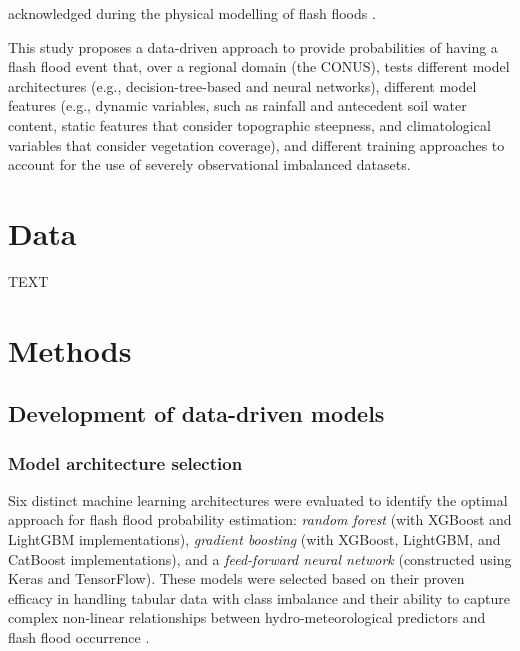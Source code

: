 \documentclass[nhess, manuscript]{copernicus}
\begin{document}
acknowledged during the physical modelling of flash floods \citep{Saharia_2021}.

This study proposes a data-driven approach to provide probabilities of having a flash flood event that, over a regional domain (the CONUS), tests different model architectures (e.g., decision-tree-based and neural networks), different model features (e.g., dynamic variables,  such as rainfall and antecedent soil water content, static features that consider topographic steepness, and climatological variables that consider vegetation coverage), and different training approaches to account for the use of severely observational imbalanced datasets.

\section{Data}
TEXT


\section{Methods}

\subsection{Development of data-driven models}

\subsubsection{Model architecture selection}

Six distinct machine learning architectures were evaluated to identify the optimal approach for flash flood probability estimation: \textit{random forest} (with XGBoost and LightGBM implementations), \textit{gradient boosting} (with XGBoost, LightGBM, and CatBoost implementations), and a \textit{feed-forward neural network} (constructed using Keras and TensorFlow). These models were selected based on their proven efficacy in handling tabular data with class imbalance and their ability to capture complex non-linear relationships between hydro-meteorological predictors and flash flood occurrence \citep{Shwartz-Ziv_2022}.
\end{document}
